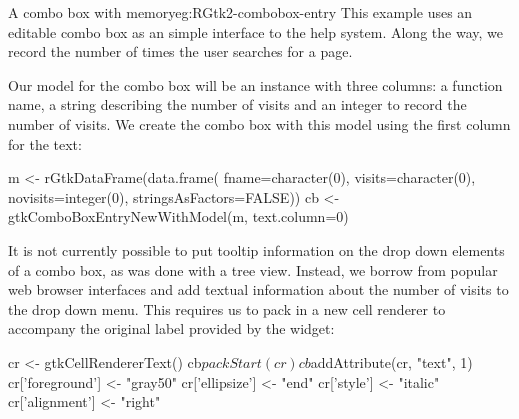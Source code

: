 \begin{example}{A combo box with memory}{eg:RGtk2-combobox-entry}
This example uses an editable combo box as an simple interface to the
\R\/ help system. Along the way, we record the number of times the
user searches for a page.

Our model for the combo box will be an  instance
with three columns: a function name, a string describing the
number of visits and an integer to record the number of visits. We
create the combo box with this model using the first column for the text:
\begin{Schunk}
\begin{Sinput}
 m <- rGtkDataFrame(data.frame(
              fname=character(0), visits=character(0), 
              novisits=integer(0), stringsAsFactors=FALSE))
 cb <- gtkComboBoxEntryNewWithModel(m, text.column=0)
\end{Sinput}
\end{Schunk}

It is not currently possible to put tooltip information on the drop
down elements of a combo box, as was done with a tree view. Instead,
we borrow from popular web browser interfaces and add textual
information about the number of visits to the drop down menu. This
requires us to pack in a new cell renderer to accompany the original
label provided by the  widget:
\begin{Schunk}
\begin{Sinput}
 cr <- gtkCellRendererText()
 cb$packStart(cr)
 cb$addAttribute(cr, "text", 1)
 cr['foreground'] <- "gray50"
 cr['ellipsize'] <- "end"
 cr['style'] <- "italic"
 cr['alignment'] <- "right"
\end{Sinput}
\end{Schunk}




\end{example}
